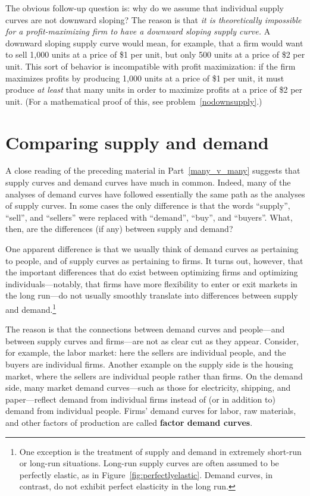 The obvious follow-up question is: why do we assume that individual supply curves are not downward sloping? The reason is that \emph{it is theoretically impossible for a profit-maximizing firm to have a downward sloping supply curve.} A downward sloping supply curve would mean, for example, that a firm would want to sell 1,000 units at a price of \$1 per unit, but only 500 units at a price of \$2 per unit. This sort of behavior is incompatible with profit maximization: if the firm maximizes profits by producing 1,000 units at a price of \$1 per unit, it must produce \emph{at least} that many units in order to maximize profits at a price of \$2 per unit. (For a mathematical proof of this, see problem~\ref{nodownsupply}.)





\section{Comparing supply and demand}

A close reading of the preceding material in Part~\ref{many_v_many} suggests that supply curves and demand curves have much in common. Indeed, many of the analyses of demand curves have followed essentially the same path as the analyses of supply curves. In some cases the only difference is that the words ``supply'', ``sell'', and ``sellers'' were replaced with ``demand'', ``buy'', and ``buyers''. What, then, are the differences (if any) between supply and demand?

One apparent difference is that we usually think of demand curves as pertaining to people, and of supply curves as pertaining to firms. It turns out, however, that the important differences that do exist between optimizing firms and optimizing individuals---notably, that firms have more flexibility to enter or exit markets in the long run---do not usually smoothly translate into differences between supply and demand.\footnote{One exception is the treatment of supply and demand in extremely short-run or long-run situations. Long-run supply curves are often assumed to be perfectly elastic, as in Figure~\ref{fig:perfectlyelastic}. Demand curves, in contrast, do not exhibit perfect elasticity in the long run.}

The reason is that the connections between demand curves and people---and between supply curves and firms---are not as clear cut as they appear. Consider, for example, the labor market: here the sellers are individual people, and the buyers are individual firms. Another example on the supply side is the housing market, where the sellers are individual people rather than firms. On the demand side, many market demand curves---such as those for electricity, shipping, and paper---reflect demand from individual firms instead of (or in addition to) demand from individual people. Firms' demand curves for labor, raw materials, and other factors of production are called \textbf{factor demand curves}.

